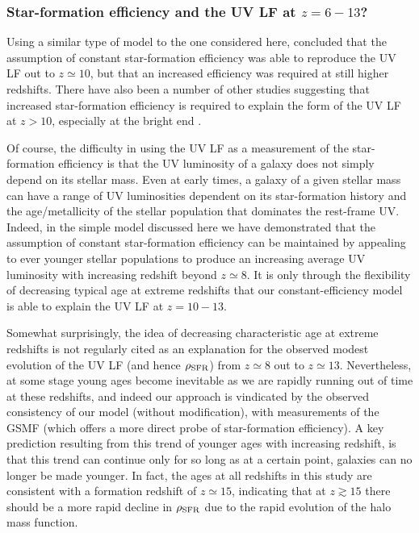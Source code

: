 \documentclass[fleqn,usenatbib]{mnras}
\begin{document}
\subsubsection{Star-formation efficiency and the UV LF at $z=6-13$?}
Using a similar type of model to the one considered here, \citet{harikane2023a} concluded that the assumption of constant star-formation efficiency was able to reproduce the UV LF out to $z\simeq10$, but that an increased efficiency was required at still higher redshifts. There have also been a number of other studies suggesting that increased star-formation efficiency is required to explain the form of the UV LF at $z > 10$, especially at the bright end \citep[e.g.][]{dekel2023}. 

Of course, the difficulty in using the UV LF as a measurement of the star-formation efficiency is that the UV luminosity of a galaxy does not simply depend on its stellar mass. Even at early times, a galaxy of a given stellar mass can have a range of UV luminosities dependent on its star-formation history and the age/metallicity of the stellar population that dominates the rest-frame UV. Indeed, in the simple model discussed here we have demonstrated that the assumption of constant star-formation efficiency can be maintained by appealing to ever younger stellar populations to produce an increasing average UV luminosity with increasing redshift beyond $z \simeq 8$. It is only through the flexibility of decreasing typical age at extreme redshifts that our constant-efficiency model is able to explain the UV LF at $z=10-13$. 

Somewhat surprisingly, the idea of decreasing characteristic age at extreme redshifts is not regularly cited as an explanation for the observed modest evolution of the UV LF (and hence $\rho_{\rm SFR}$) from $z \simeq 8$ out to $z \simeq 13$. Nevertheless, at some stage young ages become inevitable as we are rapidly running out of time at these redshifts, and indeed our approach is vindicated by the observed consistency of our model (without modification), with measurements of the GSMF (which offers a more direct probe of star-formation efficiency). A key prediction resulting from this trend of younger ages with increasing redshift, is that this trend can continue only for so long as at a certain point, galaxies can no longer be made younger. In fact, the ages at all redshifts in this study are consistent with a formation redshift of $z\simeq15$, indicating that at $z\gtrsim15$ there should be a more rapid decline in $\rho_{\rm SFR}$ due to the rapid evolution of the halo mass function.
\end{document}
